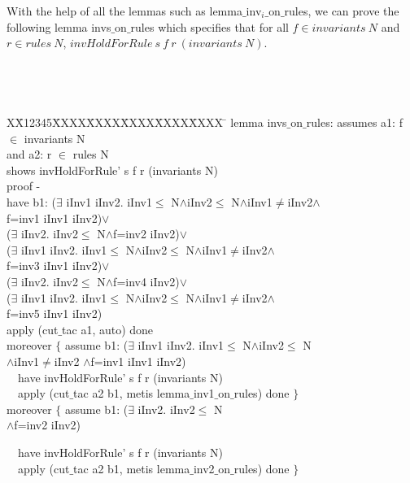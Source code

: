 \documentclass[final]{IEEEtran}
\newlength{\fminilength}
\newenvironment{fmini}[1][\linewidth]
  {\setlength{\fminilength}{#1\fboxsep-2\fboxrule}%
   \vspace{2ex}\noindent\begin{lrbox}{\fminibox}\begin{minipage}{\fminilength}%
   \mbox{ }\hfill\vspace{-2.5ex}}%
  {\end{minipage}\end{lrbox}\vspace{1ex}\hspace{0ex}%
   \framebox{\usebox{\fminibox}}}
\newenvironment{specification}
{\noindent\scriptsize
\tt\begin{fmini}\begin{tabbing}X\=X12345\=XXXX\=XXXX\=XXXX\=XXXX\=XXXX
\=\+\kill} {\end{tabbing}\normalfont\end{fmini}}
\def \twoSpaces {\ \ }
\def \iInv {iInv}
\begin{document}
With the help of all the lemmas such as {\sf lemma$\_$inv$_i\_$on$\_$rules},  we can prove the following lemma  {\sf invs$\_$on$\_$rules} which
specifies that for all $f \in invariants~ N$ and $r \in rules~ N$,   $invHoldForRule ~s~ f~ r~ (invariants~ N)$.

\begin{specification}
lemma invs$\_$on$\_$rules:
assumes a1:
f $\in$ invariants N \\
 and a2:
r $\in$ rules N\\
shows
invHoldForRule' s f r (invariants N)\\

  proof -\\
  have b1:
($\exists$ \iInv1 \iInv2. \iInv1$\le$
N$\wedge$\iInv2$\le$
N$\wedge$\iInv1$\neq$\iInv2$\wedge$\\
f=inv1  \iInv1 \iInv2)$\vee$\\
    ($\exists$ \iInv2. \iInv2$\le$
N$\wedge$f=inv2  \iInv2)$\vee$\\
    ($\exists$ \iInv1 \iInv2. \iInv1$\le$
N$\wedge$\iInv2$\le$
N$\wedge$\iInv1$\neq$\iInv2$\wedge$\\
f=inv3  \iInv1 \iInv2)$\vee$\\
    ($\exists$ \iInv2. \iInv2$\le$
N$\wedge$f=inv4  \iInv2)$\vee$\\
    ($\exists$ \iInv1 \iInv2. \iInv1$\le$
N$\wedge$\iInv2$\le$
N$\wedge$\iInv1$\neq$\iInv2$\wedge$\\
f=inv5  \iInv1 \iInv2)\\

  apply (cut$\_$tac a1, auto) done\\
    moreover $\{$      assume b1:
($\exists$ \iInv1 \iInv2. \iInv1$\le$
N$\wedge$\iInv2$\le$ N \\
$\wedge$\iInv1$\neq$\iInv2  
$\wedge$f=inv1  \iInv1 \iInv2)\\

\twoSpaces       have
invHoldForRule' s f r (invariants N)\\

\twoSpaces      apply (cut$\_$tac a2 b1, metis lemma$\_$inv1$\_$on$\_$rules) done
    $\}$\\


    moreover $\{$ assume b1:
($\exists$ \iInv2. \iInv2$\le$ N\\
$\wedge$f=inv2  \iInv2)

\twoSpaces       have invHoldForRule' s f r (invariants N)\\

\twoSpaces      apply (cut$\_$tac a2 b1, metis lemma$\_$inv2$\_$on$\_$rules) done
    $\}$\\



\end{specification}
\end{document}
